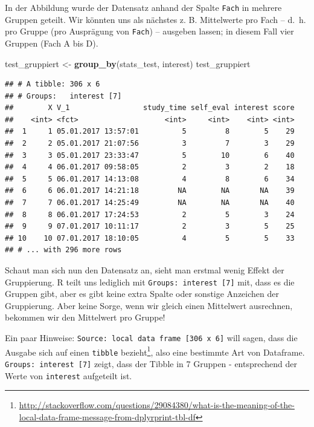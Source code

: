 \documentclass[12pt,ngerman,paper=a4,pagesize,DIV=13]{scrreprt}
\newenvironment{Shaded}{\begin{snugshade}}{\end{snugshade}}
\newcommand{\KeywordTok}[1]{\textcolor[rgb]{0.13,0.29,0.53}{\textbf{#1}}}
\newcommand{\NormalTok}[1]{#1}
\newcommand{\StringTok}[1]{\textcolor[rgb]{0.31,0.60,0.02}{#1}}
\begin{document}
In der Abbildung wurde der Datensatz anhand der Spalte \texttt{Fach} in
mehrere Gruppen geteilt. Wir könnten uns als nächstes z. B. Mittelwerte
pro Fach -- d.~h. pro Gruppe (pro Ausprägung von \texttt{Fach}) --
ausgeben lassen; in diesem Fall vier Gruppen (Fach A bis D).

\begin{Shaded}
\begin{Highlighting}[]
\NormalTok{test_gruppiert <-}\StringTok{ }\KeywordTok{group_by}\NormalTok{(stats_test, interest)}
\NormalTok{test_gruppiert}
\end{Highlighting}
\end{Shaded}

\begin{verbatim}
## # A tibble: 306 x 6
## # Groups:   interest [7]
##        X V_1                 study_time self_eval interest score
##    <int> <fct>                    <int>     <int>    <int> <int>
##  1     1 05.01.2017 13:57:01          5         8        5    29
##  2     2 05.01.2017 21:07:56          3         7        3    29
##  3     3 05.01.2017 23:33:47          5        10        6    40
##  4     4 06.01.2017 09:58:05          2         3        2    18
##  5     5 06.01.2017 14:13:08          4         8        6    34
##  6     6 06.01.2017 14:21:18         NA        NA       NA    39
##  7     7 06.01.2017 14:25:49         NA        NA       NA    40
##  8     8 06.01.2017 17:24:53          2         5        3    24
##  9     9 07.01.2017 10:11:17          2         3        5    25
## 10    10 07.01.2017 18:10:05          4         5        5    33
## # ... with 296 more rows
\end{verbatim}

Schaut man sich nun den Datensatz an, sieht man erstmal wenig Effekt der
Gruppierung. R teilt uns lediglich mit
\texttt{Groups:\ interest\ {[}7{]}} mit, dass es die Gruppen gibt, aber
es gibt keine extra Spalte oder sonstige Anzeichen der Gruppierung. Aber
keine Sorge, wenn wir gleich einen Mittelwert ausrechnen, bekommen wir
den Mittelwert pro Gruppe!

Ein paar Hinweise: \texttt{Source:\ local\ data\ frame\ {[}306\ x\ 6{]}}
will sagen, dass die Ausgabe sich auf einen \texttt{tibble}
bezieht\footnote{\url{http://stackoverflow.com/questions/29084380/what-is-the-meaning-of-the-local-data-frame-message-from-dplyrprint-tbl-df}},
also eine bestimmte Art von Dataframe.
\texttt{Groups:\ interest\ {[}7{]}} zeigt, dass der Tibble in 7 Gruppen
- entsprechend der Werte von \texttt{interest} aufgeteilt ist.
\end{document}
